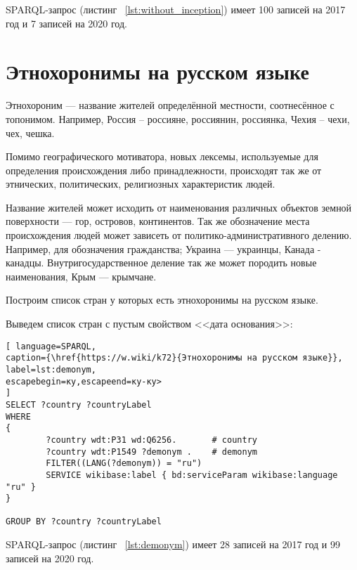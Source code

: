 SPARQL-запрос (листинг ~\ref{lst:without_inception}) имеет 100 записей на 2017 год и 7 записей на 2020 год.
\section{Этнохоронимы на русском языке}

Этнохороним — название жителей определённой местности, соотнесённое с топонимом. Например, Россия – россияне, россиянин, россиянка, Чехия – чехи, чех, чешка.

Помимо географического мотиватора, новых лексемы, используемые для определения происхождения либо принадлежности, происходят так же от этнических, политических, религиозных характеристик людей. 

Название жителей может исходить от наименования различных объектов земной поверхности — гор, островов, континентов. Так же обозначение места происхождения людей может зависеть от политико-административного делению. Например, для обозначения гражданства; Украина — украинцы, Канада - канадцы. Внутригосударственное деление так же может породить новые наименования, Крым — крымчане.

Построим список стран у которых есть этнохоронимы на русском языке.

Выведем список стран с пустым свойством <<дата основания>>:



\begin{lstlisting}[ language=SPARQL, 
caption={\href{https://w.wiki/k72}{Этнохоронимы на русском языке}},
label=lst:demonym, 
escapebegin=ку,escapeend=ку-ку>
]
SELECT ?country ?countryLabel 
WHERE
{
		?country wdt:P31 wd:Q6256.       # country
		?country wdt:P1549 ?demonym .    # demonym
		FILTER((LANG(?demonym)) = "ru")
		SERVICE wikibase:label { bd:serviceParam wikibase:language "ru" }
}

GROUP BY ?country ?countryLabel
\end{lstlisting}

SPARQL-запрос (листинг ~\ref{lst:demonym}) имеет 28 записей на 2017 год и 99 записей на 2020 год.

